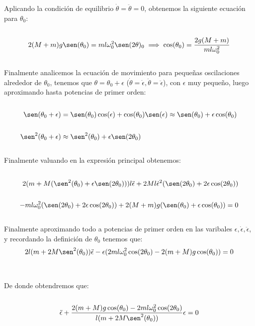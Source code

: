\documentclass[11pt,letterpaper]{article}
\begin{document}
Aplicando la condici\'on de equilibrio $\dot{\theta}=\ddot{\theta}=0$, obtenemos la siguiente ecuaci\'on para $\theta_0$:\,\\
\,\\
\begin{align*}
    2(M+m)g\sen(\theta_0)=ml\omega_0^2\sen(2\theta)_0\implies\cos(\theta_0)=\frac{2g(M+m)}{ml\omega_0^2}
\end{align*}\,\\
Finalmente analicemos la ecuaci\'on de movimiento para pequeñas oscilaciones  alrededor de $\theta_0$, tenemos que $\theta=\theta_0+\epsilon$ ($\dot{\theta}=\dot{\epsilon},\ddot{\theta}=\ddot{\epsilon}$), con $\epsilon$ muy pequeño, luego aproximando hasta potencias de primer orden:\,\\
\,\\
\begin{align*}
    \sen(\theta_0+\epsilon)&=\sen(\theta_0)\cos(\epsilon)+\cos(\theta_0)\sen(\epsilon)\approx \sen(\theta_0)+\epsilon\cos(\theta_0)\,\\
    \,\\
    \sen^2(\theta_0+\epsilon)&\approx \sen^2(\theta_0)+\epsilon\sen(2\theta_0) 
\end{align*}\,\\
Finalmente valuando en la expresi\'on principal obtenemos:\,\\
\,\\
\begin{align*}
    2(m+M(\sen^2(\theta_0)+\epsilon\sen(2\theta_0)))l\ddot{\epsilon}+2Ml\dot{\epsilon}^2(\sen(2\theta_0)+2\epsilon\cos(2\theta_0))\\
    \,\\
    -ml\omega_0^2(\sen(2\theta_0)+2\epsilon\cos(2\theta_0))+2(M+m)g(\sen(\theta_0)+\epsilon\cos(\theta_0))=0
\end{align*}\,\\
Finalmente aproximando todo a potencias de primer orden en las varibales $\epsilon,\dot{\epsilon},\ddot{\epsilon}$, y recordando la definici\'on de $\theta_0$ tenemos que:
\,\\
\begin{equation*}
    2l(m+2M\sen^2(\theta_0))\ddot{\epsilon}-\epsilon(2ml\omega^2_0\cos(2\theta_0)-2(m+M)g\cos(\theta_0))=0
\end{equation*}\,\\
\,\\
De donde obtendremos que:\,\\
\,\\
\begin{equation*}
    \ddot{\epsilon}+\frac{2(m+M)g\cos(\theta_0)-2ml\omega^2_0\cos(2\theta_0)}{l(m+2M\sen^2(\theta_0))}\epsilon=0
\end{equation*}\,\\
\end{document}
